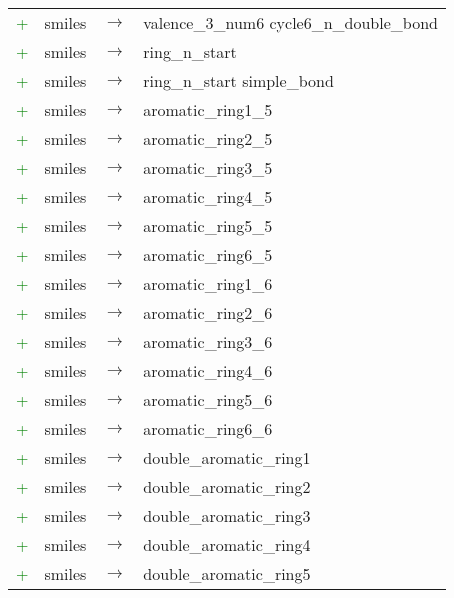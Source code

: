 \begin{longtable}{m{} m{} p{} p{}}
    \textcolor{green}{+} & smiles & $\rightarrow$ & valence\_3\_num6 cycle6\_n\_double\_bond \\
    \textcolor{green}{+} & smiles & $\rightarrow$ & ring\_n\_start \\
    \textcolor{green}{+} & smiles & $\rightarrow$ & ring\_n\_start simple\_bond \\
    \textcolor{green}{+} & smiles & $\rightarrow$ & aromatic\_ring1\_5 \\
    \textcolor{green}{+} & smiles & $\rightarrow$ & aromatic\_ring2\_5 \\
    \textcolor{green}{+} & smiles & $\rightarrow$ & aromatic\_ring3\_5 \\
    \textcolor{green}{+} & smiles & $\rightarrow$ & aromatic\_ring4\_5 \\
    \textcolor{green}{+} & smiles & $\rightarrow$ & aromatic\_ring5\_5 \\
    \textcolor{green}{+} & smiles & $\rightarrow$ & aromatic\_ring6\_5 \\
    \textcolor{green}{+} & smiles & $\rightarrow$ & aromatic\_ring1\_6 \\
    \textcolor{green}{+} & smiles & $\rightarrow$ & aromatic\_ring2\_6 \\
    \textcolor{green}{+} & smiles & $\rightarrow$ & aromatic\_ring3\_6 \\
    \textcolor{green}{+} & smiles & $\rightarrow$ & aromatic\_ring4\_6 \\
    \textcolor{green}{+} & smiles & $\rightarrow$ & aromatic\_ring5\_6 \\
    \textcolor{green}{+} & smiles & $\rightarrow$ & aromatic\_ring6\_6 \\
    \textcolor{green}{+} & smiles & $\rightarrow$ & double\_aromatic\_ring1 \\
    \textcolor{green}{+} & smiles & $\rightarrow$ & double\_aromatic\_ring2 \\
    \textcolor{green}{+} & smiles & $\rightarrow$ & double\_aromatic\_ring3 \\
    \textcolor{green}{+} & smiles & $\rightarrow$ & double\_aromatic\_ring4 \\
    \textcolor{green}{+} & smiles & $\rightarrow$ & double\_aromatic\_ring5 \\


\end{longtable}

